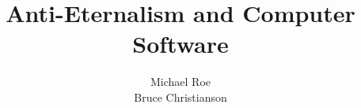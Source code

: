 \documentclass{article}
\title{Anti-Eternalism and Computer Software}
\author{
Michael Roe \\
Bruce Christianson \\
}
\begin{document}
\maketitle

\cite{*}



\end{document}

